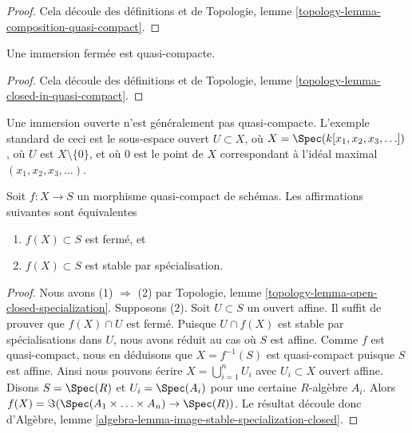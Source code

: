 \begin{proof}
Cela découle des définitions et de
Topologie, lemme \ref{topology-lemma-composition-quasi-compact}.
\end{proof}

\begin{lemma}
\label{lemma-closed-immersion-quasi-compact}
Une immersion fermée est quasi-compacte.
\end{lemma}

\begin{proof}
Cela découle des définitions et de
Topologie, lemme \ref{topology-lemma-closed-in-quasi-compact}.
\end{proof}

\begin{example}
\label{example-open-immersion-not-quasi-compact}
Une immersion ouverte n'est généralement pas
quasi-compacte. L'exemple standard de ceci est le sous-espace
ouvert $U \subset X$, où $X = \Spec(k[x_1, x_2, x_3,
\ldots])$, où $U$ est $X \setminus \{0\}$, et où $0$ est le point
de $X$ correspondant à l'idéal maximal
$(x_1, x_2, x_3, \ldots)$.
\end{example}

\begin{lemma}
\label{lemma-image-quasi-compact-closed}
Soit $f : X \to S$ un morphisme quasi-compact de schémas. Les affirmations
suivantes sont équivalentes
\begin{enumerate}
\item $f(X) \subset S$ est fermé, et
\item $f(X) \subset S$ est stable par spécialisation.
\end{enumerate}
\end{lemma}

\begin{proof}
Nous avons (1) $\Rightarrow$ (2) par
Topologie, lemme \ref{topology-lemma-open-closed-specialization}.
Supposons (2). Soit $U \subset S$ un ouvert affine. Il suffit de prouver que
$f(X) \cap U$ est fermé. Puisque $U \cap f(X)$ est stable par
spécialisations dans $U$, nous avons réduit au cas où $S$ est affine. Comme $f$ est
quasi-compact, nous en déduisons que $X = f^{-1}(S)$ est quasi-compact
puisque $S$ est affine. Ainsi nous pouvons écrire
$X = \bigcup_{i = 1}^n U_i$ avec $U_i \subset X$ ouvert affine.
Disons $S = \Spec(R)$
et $U_i = \Spec(A_i)$ pour une certaine $R$-algèbre
$A_i$. Alors $f(X) = \Im(\Spec(A_1 \times \ldots \times
A_n) \to \Spec(R))$. Le résultat découle donc
d'Algèbre, lemme \ref{algebra-lemma-image-stable-specialization-closed}.
\end{proof}

